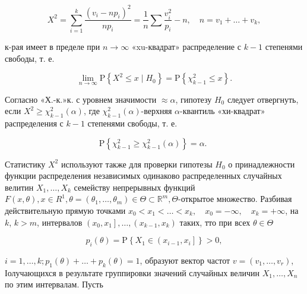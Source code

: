 \documentclass[10pt]{article}
\begin{document}
\[

X^{2}=\sum_{i=1}^{k} \frac{\left(v_{i}-n p_{i}\right)^{2}}{n p_{i}}=\frac{1}{n} \sum \frac{v_{i}^{2}}{p_{i}}-n, \quad n=v_{1}+\ldots+v_{k},

\]



к-рая имеет в пределе при $n \rightarrow \infty$ «xu-квадрат» распределение с $k-1$ степенями свободы, т. е.



\[

\lim _{n \rightarrow \infty} \mathrm{P}\left\{X^{2} \leqslant x \mid H_{0}\right\}=\mathrm{P}\left\{\chi_{k-1}^{2} \leqslant x\right\} .

\]



Согласно «Х.-к.»к. с уровнем значимости $\approx \alpha$, гипотезу $H_{0}$ следует отвергнуть, если $X^{2} \geqslant \chi_{k-1}^{2}(\alpha)$, где $\chi_{k-1}^{2}(\alpha)$-верхняя $\alpha$-квантиль «хи-квадрат» распределения с $k-1$ степенями свободы, т. е.



\[

\mathrm{P}\left\{\chi_{k-1}^{2} \geqslant \chi_{k-1}^{2}(\alpha)\right\}=\alpha \text {. }

\]



Статистику $X^{2}$ используют также для проверки гипотезы $H_{0}$ о принадлежности функции распределения независимых одинаково распределенных случайных велитин $X_{1}, \ldots, X_{k}$ семейству непрерывных функций $F(x, \theta), x \in R^{1}, \theta=\left(\theta_{1}, \ldots, \theta_{m}\right) \in \Theta \subset \mathbb{R}^{m}, \Theta$-открытое множество. Разбивая действительную прямую точками $x_{0}<x_{1}<\ldots<x_{k}, \quad x_{0}=-\infty, \quad x_{k}=+\infty$, на $k$, $k>m$, интервалов $\left(x_{0}, x_{1}\right], \ldots,\left(x_{k-1}, x_{k}\right)$ таких, тто при всех $\theta \in \Theta$



\[

p_{i}(\theta)=\mathrm{P}\left\{X_{1} \in\left(x_{i-1}, x_{i}\right]\right\}>0,

\]



$i=1, \ldots, k ; p_{1}(\theta)+\ldots+p_{k}(\theta)=1$, образуют вектор частот $v=\left(v_{1}, \ldots, v_{r}\right)$, Іолучающихся в результате группировки значений случайных величин $X_{1}, \ldots, X_{n}$ по этим интервалам. Пусть
\end{document}
